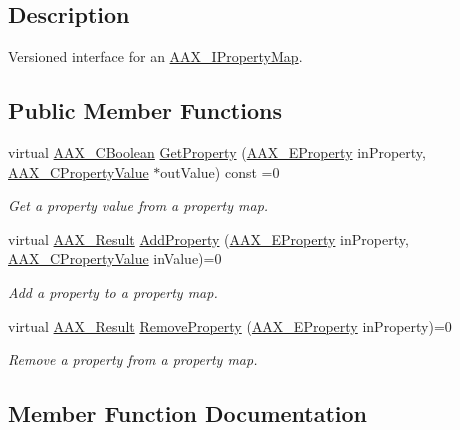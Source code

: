 \subsection{Description}
Versioned interface for an \mbox{\hyperlink{a01869}{A\+A\+X\+\_\+\+I\+Property\+Map}}. \subsection*{Public Member Functions}
\begin{DoxyCompactItemize}
\item 
virtual \mbox{\hyperlink{a00392_aa216506530f1d19a2965931ced2b274b}{A\+A\+X\+\_\+\+C\+Boolean}} \mbox{\hyperlink{a01745_a64eb5a98b54452ad0c4e09b32811a4e8}{Get\+Property}} (\mbox{\hyperlink{a00662_a13e384f22825afd3db6d68395b79ce0d}{A\+A\+X\+\_\+\+E\+Property}} in\+Property, \mbox{\hyperlink{a00392_ab247c0d8686c14e05cbb567ef276f249}{A\+A\+X\+\_\+\+C\+Property\+Value}} $\ast$out\+Value) const =0
\begin{DoxyCompactList}\small\item\em Get a property value from a property map. \end{DoxyCompactList}\item 
virtual \mbox{\hyperlink{a00392_a4d8f69a697df7f70c3a8e9b8ee130d2f}{A\+A\+X\+\_\+\+Result}} \mbox{\hyperlink{a01745_ae2ef22ba98aeb1502b0115173390f12a}{Add\+Property}} (\mbox{\hyperlink{a00662_a13e384f22825afd3db6d68395b79ce0d}{A\+A\+X\+\_\+\+E\+Property}} in\+Property, \mbox{\hyperlink{a00392_ab247c0d8686c14e05cbb567ef276f249}{A\+A\+X\+\_\+\+C\+Property\+Value}} in\+Value)=0
\begin{DoxyCompactList}\small\item\em Add a property to a property map. \end{DoxyCompactList}\item 
virtual \mbox{\hyperlink{a00392_a4d8f69a697df7f70c3a8e9b8ee130d2f}{A\+A\+X\+\_\+\+Result}} \mbox{\hyperlink{a01745_a10bc1440141e74e3c62499754574f935}{Remove\+Property}} (\mbox{\hyperlink{a00662_a13e384f22825afd3db6d68395b79ce0d}{A\+A\+X\+\_\+\+E\+Property}} in\+Property)=0
\begin{DoxyCompactList}\small\item\em Remove a property from a property map. \end{DoxyCompactList}\end{DoxyCompactItemize}


\subsection{Member Function Documentation}
\mbox{\label{a01745_a64eb5a98b54452ad0c4e09b32811a4e8}} 
